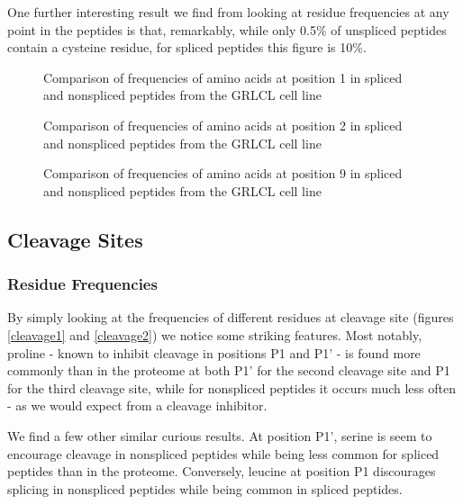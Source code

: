 \documentclass[10pt,a4paper,twoside,twocolumn]{article}
\begin{document}
One further interesting result we find from looking at residue frequencies at any point in the peptides is that, remarkably, while only 0.5\% of unspliced peptides contain a cysteine residue, for spliced peptides this figure is 10\%.

	\begin{figure}
		\setlength\figureheight{4cm}
		\setlength{}
		
		\caption{Comparison of frequencies of amino acids at position 1 in spliced and nonspliced peptides from the GRLCL cell line}
		\label{GRLCL-1}
	\end{figure}
	\begin{figure}
		\setlength\figureheight{4cm}
		\setlength{}
		
		\caption{Comparison of frequencies of amino acids at position 2 in spliced and nonspliced peptides from the GRLCL cell line}
		\label{GRLCL-2}
	\end{figure}
	\begin{figure}
		\setlength\figureheight{4cm}
		\setlength{}
		
		\caption{Comparison of frequencies of amino acids at position 9 in spliced and nonspliced peptides from the GRLCL cell line}
		\label{GRLCL-9}
	\end{figure}

\subsection*{Cleavage Sites}
\subsubsection*{Residue Frequencies}

By simply looking at the frequencies of different residues at cleavage site (figures \ref{cleavage1} and \ref{cleavage2}) we notice some striking features. Most notably, proline - known to inhibit cleavage in positions P1 and P1' \cite{Kesmir2002}- is found more commonly than in the proteome at both P1' for the second cleavage site and P1 for the third cleavage site, while for nonspliced peptides it occurs much less often - as we would expect from a cleavage inhibitor.

We find a few other similar curious results. At position P1', serine is seem to encourage cleavage in nonspliced peptides while being less common for spliced peptides than in the proteome. Conversely, leucine at position P1 discourages splicing in nonspliced peptides while being common in spliced peptides.
\end{document}
